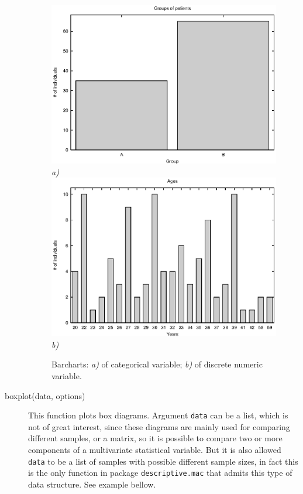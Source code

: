 \documentclass[12pt,a4paper]{article}
\begin{document}
\begin{description}
\begin{figure}
\begin{center}
\includegraphics[scale=1.0]{barsplot1.eps} \\
\emph{a)} \\ 
\includegraphics[scale=1.0]{barsplot2.eps} \\
\emph{b)} \\
\caption{Barcharts: \emph{a)} of categorical variable; \emph{b)} of discrete numeric variable.}
\label{fig5}
\end{center}
\end{figure}


\item[boxplot(data, options)] This function plots box diagrams. Argument \verb|data| can be a list, which is not of great interest, since these diagrams are mainly used for comparing different samples, or a matrix, so it is possible to compare two or more components of a multivariate statistical variable. But it is also allowed \verb|data| to be a list of samples with possible different sample sizes, in fact this is the only function in package \verb|descriptive.mac| that admits this type of data structure. See example bellow.


\end{description}
\end{document}
